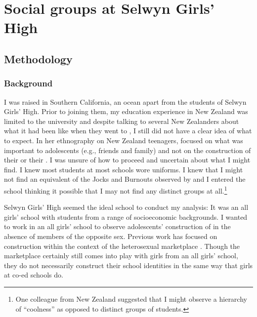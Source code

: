 \chapter{Social groups at Selwyn Girls' High}
\label{ch:ethnography}
\date{}





\section{Methodology}

\subsection{Background}

I was raised in Southern California, an ocean apart from the students of Selwyn Girls' High. Prior to joining them, my education experience in New Zealand was limited to the university and despite talking to several New Zealanders about what it had been like when they went to , I still did not have a clear idea of what to expect. In her ethnography on New Zealand teenagers, \citet{gray1988} focused on what was important to adolescents (e.g., friends and family) and not on the construction of their  or their . I was unsure of how to proceed and uncertain about what I might find. I knew most students at most schools wore uniforms. I knew that I might not find an equivalent of the Jocks and Burnouts observed by \citet{eckert1989} and I entered the school thinking it possible that I may not find any distinct groups at all.\footnote{One colleague from New Zealand suggested that I might observe a hierarchy of ``coolness'' as opposed to distinct groups of students.}   


Selwyn Girls' High seemed the ideal school to conduct my analysis: It was an all girls' school with students from a range of socioeconomic backgrounds. I wanted to work in an all girls' school to observe adolescents' construction of  in the absence of members of the opposite sex. Previous work has focused on  construction within the context of the heterosexual marketplace \citep{eckert1996nailpolish}. Though the marketplace certainly still comes into play with girls from an all girls' school, they do not necessarily construct their school identities in the same way that girls at co-ed schools do. 

